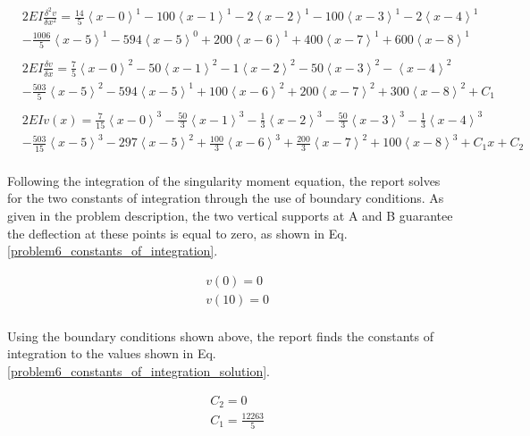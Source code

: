 \documentclass[a4paper]{article}
\begin{document}
\begin{equation}
    \begin{split}
& 2EI \frac{\delta^2 v}{\delta x^2} = \frac{14}{5}\left<x-0\right>^1 - 100\left<x-1\right>^1 -  2\left<x-2\right>^1 - 100\left<x-3\right>^1 - 2\left<x-4\right>^1 \\
& - \frac{1006}{5}\left<x-5\right>^1 - 594\left<x-5\right>^0 + 200\left<x-6\right>^1 + 400\left<x-7\right>^1 + 600\left<x-8\right>^1 \\
& \\
& 2EI \frac{\delta v}{\delta x} = \frac{7}{5}\left<x-0\right>^2 - 50\left<x-1\right>^2 -  1\left<x-2\right>^2 - 50\left<x-3\right>^2 - \left<x-4\right>^2 \\
& - \frac{503}{5}\left<x-5\right>^2 - 594\left<x-5\right>^1 + 100\left<x-6\right>^2 + 200\left<x-7\right>^2 + 300\left<x-8\right>^2 + C_1 \\
& \\
& 2EI v(x) = \frac{7}{15}\left<x-0\right>^3 - \frac{50}{3}\left<x-1\right>^3 -  \frac{1}{3}\left<x-2\right>^3 - \frac{50}{3}\left<x-3\right>^3 - \frac{1}{3}\left<x-4\right>^3 \\
& - \frac{503}{15}\left<x-5\right>^3 - 297\left<x-5\right>^2 + \frac{100}{3}\left<x-6\right>^3 + \frac{200}{3}\left<x-7\right>^2 + 100\left<x-8\right>^3 + C_1x + C_2\\
    \end{split}
\label{problem6_equations}
\end{equation}

Following the integration of the singularity moment equation, the report solves for the two constants of integration through the use of boundary conditions. As given in the problem description, the two vertical supports at A and B guarantee the deflection at these points is equal to zero, as shown in Eq. \ref{problem6_constants_of_integration}.

\begin{equation}
\begin{split}
	& v(0) = 0 \\
	& v(10) = 0 \\
\end{split}
\label{problem6_constants_of_integration}
\end{equation}

Using the boundary conditions shown above, the report finds the constants of integration to the values shown in Eq. \ref{problem6_constants_of_integration_solution}.

\begin{equation}
\begin{split}
	& C_2 = 0 \\
	& C_1 = \frac{12263}{5} \\
\end{split}
\label{problem6_constants_of_integration_solution}
\end{equation}
\end{document}
